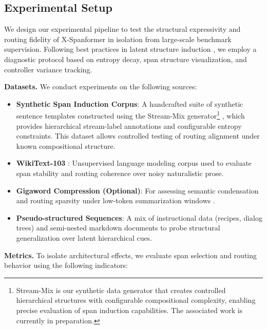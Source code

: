 \subsection{Experimental Setup}
\label{sec:experimental-setup}

We design our experimental pipeline to test the structural expressivity and routing fidelity of X-Spanformer in isolation from large-scale benchmark supervision. Following best practices in latent structure induction \cite{kim2019unsupervised, naradowsky2021structured, liu2019hierarchical}, we employ a diagnostic protocol based on entropy decay, span structure visualization, and controller variance tracking.

\vspace{0.5em}
\noindent\textbf{Datasets.} We conduct experiments on the following sources:

\begin{itemize}[leftmargin=1.5em]
  \item \textbf{Synthetic Span Induction Corpus}: A handcrafted suite of synthetic sentence templates constructed using the Stream-Mix generator\footnote{Stream-Mix is our synthetic data generator that creates controlled hierarchical structures with configurable compositional complexity, enabling precise evaluation of span induction capabilities. The associated work is currently in preparation.} \cite{rawson2025streammix-inprep}, which provides hierarchical stream-label annotations and configurable entropy constraints. This dataset allows controlled testing of routing alignment under known compositional structure.
  
  \item \textbf{WikiText-103} \cite{merity2016pointer}: Unsupervised language modeling corpus used to evaluate span stability and routing coherence over noisy naturalistic prose.

  \item \textbf{Gigaword Compression (Optional)}: For assessing semantic condensation and routing sparsity under low-token summarization windows \cite{rush2015neural}.

  \item \textbf{Pseudo-structured Sequences}: A mix of instructional data (recipes, dialog trees) and semi-nested markdown documents to probe structural generalization over latent hierarchical cues.
\end{itemize}

\vspace{0.5em}
\noindent\textbf{Metrics.} To isolate architectural effects, we evaluate span selection and routing behavior using the following indicators:

